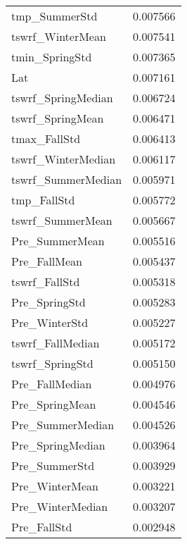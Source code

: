 \begin{tabular}{lr}
tmp_SummerStd & 0.007566 \\
tswrf_WinterMean & 0.007541 \\
tmin_SpringStd & 0.007365 \\
Lat & 0.007161 \\
tswrf_SpringMedian & 0.006724 \\
tswrf_SpringMean & 0.006471 \\
tmax_FallStd & 0.006413 \\
tswrf_WinterMedian & 0.006117 \\
tswrf_SummerMedian & 0.005971 \\
tmp_FallStd & 0.005772 \\
tswrf_SummerMean & 0.005667 \\
Pre_SummerMean & 0.005516 \\
Pre_FallMean & 0.005437 \\
tswrf_FallStd & 0.005318 \\
Pre_SpringStd & 0.005283 \\
Pre_WinterStd & 0.005227 \\
tswrf_FallMedian & 0.005172 \\
tswrf_SpringStd & 0.005150 \\
Pre_FallMedian & 0.004976 \\
Pre_SpringMean & 0.004546 \\
Pre_SummerMedian & 0.004526 \\
Pre_SpringMedian & 0.003964 \\
Pre_SummerStd & 0.003929 \\
Pre_WinterMean & 0.003221 \\
Pre_WinterMedian & 0.003207 \\
Pre_FallStd & 0.002948 \\
\bottomrule
\end{tabular}
